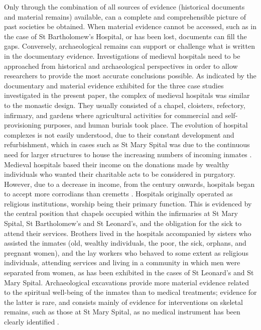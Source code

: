 \documentclass[%
	]{ijsra}
\begin{document}
\IJSRAseparator
{}
Only through the combination of all sources of evidence (historical documents and material remains) available, can a complete and comprehensible picture of past societies be obtained. When material evidence cannot be accessed, such as in the case of St Bartholomew’s Hospital, or has been lost, documents can fill the gaps. Conversely, archaeological remains can support or challenge what is written in the documentary evidence. Investigations of medieval hospitals need to be approached from historical and archaeological perspectives in order to allow researchers to provide the most accurate conclusions possible. 
As indicated by the documentary and material evidence exhibited for the three case studies investigated in the present paper, the complex of medieval hospitals was similar to the monastic design. They usually consisted of a chapel, cloisters, refectory, infirmary, and gardens where agricultural activities for commercial and self-provisioning purposes, and human burials took place. 
The evolution of hospital complexes is not easily understood, due to their constant development and refurbishment, which in cases such as St Mary Spital was due to the continuous need for larger structures to house the increasing numbers of incoming inmates \parencites[69,117-118]{Henderson_2006}[27]{Malcom_2014}[41,43]{Orme_1995}[35]{Rawcliffe_1999}.
Medieval hospitals based their income on the donations made by wealthy individuals who wanted their charitable acts to be considered in purgatory. However, due to a decrease in income, from the  century \AD onwards, hospitals began to accept more corrodians than cremetts \parencites[69]{Dean_2008}[207]{Malcom_2014}. 
Hospitals originally operated as religious institutions, worship being their primary function. This is evidenced by the central position that chapels occupied within the infirmaries at St Mary Spital, St Bartholomew’s and St Leonard’s, and the obligation for the sick to attend their services. Brothers lived in the hospitals accompanied by sisters who assisted the inmates (old, wealthy individuals, the poor, the sick, orphans, and pregnant women), and the lay workers who behaved to some extent as religious individuals, attending services and living in a community in which men were separated from women, as has been exhibited in the cases of St Leonard’s and St Mary Spital. 
Archaeological excavations provide more material evidence related to the spiritual well-being of the inmates than to medical treatments; evidence for the latter is rare, and consists mainly of evidence for interventions on skeletal remains, such as those at St Mary Spital, as no medical instrument has been clearly identified \parencite[65,76]{Bowers_2007}. 
\end{document}
